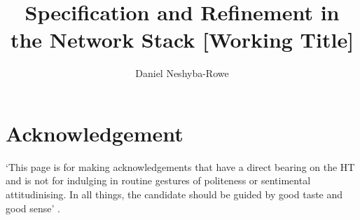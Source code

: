 \documentclass[twoside]{memoir}
\title{Specification and Refinement in the Network Stack [Working Title]} %
\author{Daniel Neshyba-Rowe}
\begin{document}
\frontmatter


\maketitle

\chapter{Acknowledgement}
`This page is for making acknowledgements that have a direct bearing on the HT and is not for indulging in routine gestures of politeness or sentimental attitudinising. In all things, the candidate should be guided by good taste and good sense' . %
\end{document}
